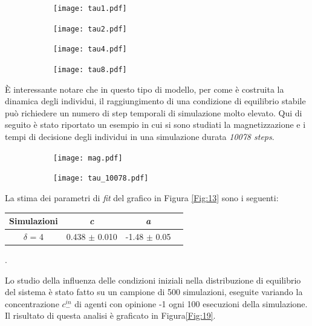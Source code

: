\documentclass[letterpaper,10pt]{article}
\begin{document}
\begin{figure}[h]
\centering
\begin{subfigure}{0.9\textwidth}
\texttt{[image: tau1.pdf]}
\end{subfigure}
\begin{subfigure}{0.9\textwidth}
\texttt{[image: tau2.pdf]}
\end{subfigure}
\end{figure}
\begin{figure}
\ContinuedFloat
\centering
\begin{subfigure}{0.9\textwidth}
\texttt{[image: tau4.pdf]}
\end{subfigure}
\begin{subfigure}{0.9\textwidth}
\texttt{[image: tau8.pdf]}
\end{subfigure}
\label{Fig:17}
\end{figure}

\[\]
È interessante notare che in questo tipo di modello, per come è costruita la dinamica degli individui, il raggiungimento di una condizione di equilibrio stabile può richiedere un numero di step temporali di simulazione molto elevato. Qui di seguito è stato riportato un esempio in cui si sono studiati la magnetizzazione
e i tempi di decisione degli individui in una simulazione durata \textit{10078 steps}.

\begin{figure}[h]
\centering
\begin{subfigure}[h]{0.9\linewidth}
\texttt{[image: mag.pdf]}
\end{subfigure}
\qquad
\begin{subfigure}[h]{0.9\linewidth}
\texttt{[image: tau\_10078.pdf]}
\end{subfigure}
\label{Fig:18}
\end{figure}

La stima dei parametri di \textit{fit} del grafico in Figura \ref{Fig:13} sono i seguenti:

\begin{center}
\begin{tabular}{ |c|c|c|c| } 
\hline
 Simulazioni & \textit{c} & \textit{a} \\
\hline
\multirow{1}{3em}{$\delta$ = 4 }
& 0.438 $\pm$ 0.010 & -1.48 $\pm$ 0.05 \\ 
\hline
\end{tabular}
\end{center}.

Lo studio della influenza delle condizioni iniziali nella distribuzione di equilibrio del sistema è stato fatto su un campione di 500 simulazioni, eseguite variando la concentrazione $c^{in}_{-}$ di agenti con opinione -1 ogni 100 esecuzioni della simulazione. Il risultato di questa analisi è graficato in Figura\ref{Fig:19}.
\end{document}
